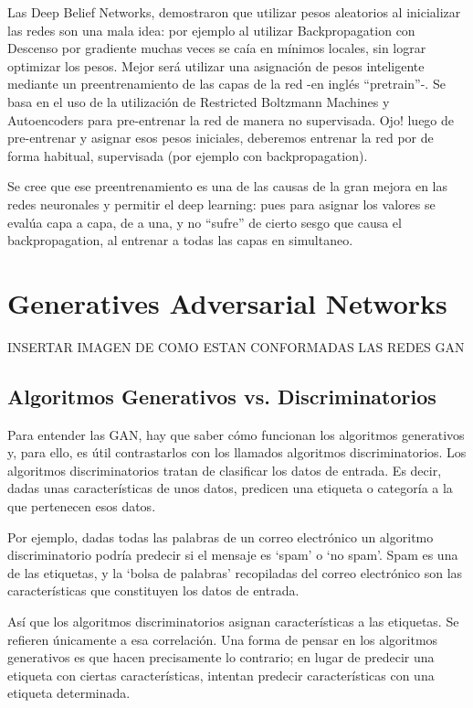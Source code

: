 \documentclass[a4paper]{article}
\begin{document}
Las Deep Belief Networks, demostraron que utilizar pesos aleatorios al inicializar las redes 
son una mala idea: por ejemplo al utilizar Backpropagation con Descenso por gradiente muchas 
veces se caía en mínimos locales, sin lograr optimizar los pesos. Mejor será utilizar una 
asignación de pesos inteligente mediante un preentrenamiento de las capas de la red -en 
inglés ``pretrain''-. Se basa en el uso de la utilización de Restricted Boltzmann Machines y 
Autoencoders para pre-entrenar la red de manera no supervisada. Ojo! luego de pre-entrenar 
y asignar esos pesos iniciales, deberemos entrenar la red por de forma habitual, supervisada 
(por ejemplo con backpropagation).

Se cree que ese preentrenamiento es una de las causas de la gran mejora en las redes 
neuronales y permitir el deep learning: pues para asignar los valores se evalúa capa a capa, 
de a una, y no “sufre” de cierto sesgo que causa el backpropagation, al entrenar a todas 
las capas en simultaneo.

\section{Generatives Adversarial Networks}
INSERTAR IMAGEN DE COMO ESTAN CONFORMADAS LAS REDES GAN

\subsection{Algoritmos Generativos vs. Discriminatorios}

Para entender las GAN, hay que saber cómo funcionan los algoritmos generativos y, para 
ello, es útil contrastarlos con los llamados algoritmos discriminatorios. Los algoritmos 
discriminatorios tratan de clasificar los datos de entrada. Es decir, dadas unas 
características de unos datos, predicen una etiqueta o categoría a la que pertenecen esos 
datos.

Por ejemplo, dadas todas las palabras de un correo electrónico un algoritmo discriminatorio 
podría predecir si el mensaje es `spam' o `no spam'. Spam es una de las etiquetas, y la 
`bolsa de palabras' recopiladas del correo electrónico son las características que 
constituyen los datos de entrada.

Así que los algoritmos discriminatorios asignan características a las etiquetas. Se 
refieren únicamente a esa correlación. Una forma de pensar en los algoritmos generativos 
es que hacen precisamente lo contrario; en lugar de predecir una etiqueta con ciertas 
características, intentan predecir características con una etiqueta determinada.
\end{document}
